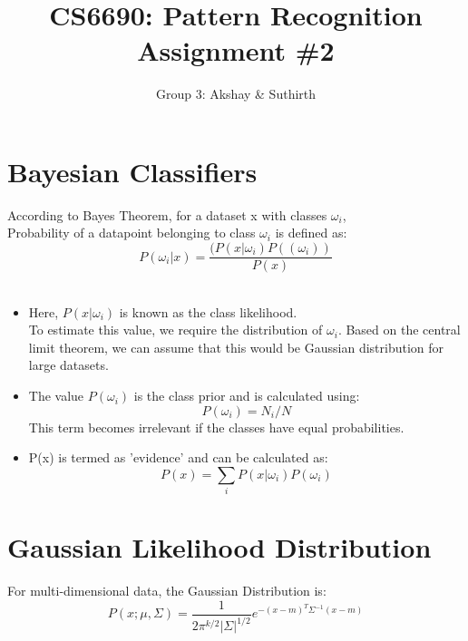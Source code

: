 \documentclass[11pt,a4paper]{article}
\begin{document}
\title{CS6690: Pattern Recognition Assignment \#2}
\author{Group 3: Akshay \& Suthirth}
\maketitle

\newpage

\section{Bayesian Classifiers}
According to Bayes Theorem, for a dataset x with classes $\omega_i$, \\
Probability of a datapoint belonging to class $\omega_i$ is defined as: \\
\begin{equation}
P(\omega_i | x) = \frac{(P(x|\omega_i)P((\omega_i))}{P(x)}
\end{equation}
\\ 

\begin{itemize}

	\item Here, $P(x|\omega_i)$ is known as the class likelihood. 
\\ To estimate this value, we require the distribution of $\omega_i$.
Based on the central limit theorem, we can assume that this would be Gaussian distribution for large datasets. 

	\item The value $P(\omega_i)$ is the class prior and is calculated using:
		\begin{equation}
		P(\omega_i) = N_i / N  
		\end{equation}
	This term becomes irrelevant if the classes have equal probabilities. 

	\item P(x) is termed as 'evidence' and can be calculated as:
	\begin{equation}
	{P(x) = \sum_i P(x | \omega_i)P(\omega_i)}
	\end{equation}
\end{itemize}

\section{Gaussian Likelihood Distribution}
 
 For multi-dimensional data, the Gaussian Distribution is:   
 \begin{equation}
 P(x;\mu,\Sigma) = \frac{1}{2\pi^{k/2}|\Sigma|^{1/2}} e^{-(x-m)^{T} \Sigma^{-1} (x-m)}
 \end{equation}
 
\end{document}
